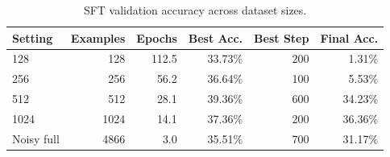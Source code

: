 \begin{table}[h]
\centering
\begin{tabular}{lrrrrr}
\toprule
Setting & Examples & Epochs & Best Acc. & Best Step & Final Acc. \\
\midrule
128 & 128 & 112.5 & 33.73\% & 200 & 1.31\% \\
256 & 256 & 56.2 & 36.64\% & 100 & 5.53\% \\
512 & 512 & 28.1 & 39.36\% & 600 & 34.23\% \\
1024 & 1024 & 14.1 & 37.36\% & 200 & 36.36\% \\
Noisy full & 4866 & 3.0 & 35.51\% & 700 & 31.17\% \\
\bottomrule
\end{tabular}
\caption{SFT validation accuracy across dataset sizes.}
\label{tab:sft-size-sweep}
\end{table}
